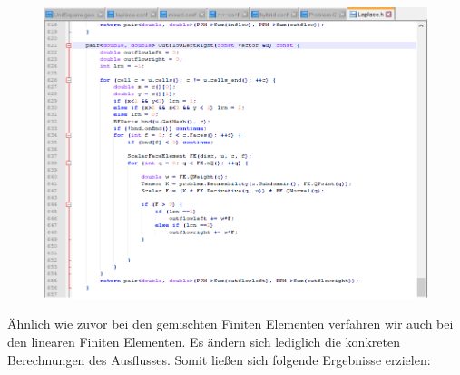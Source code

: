 \begin{figure}[H]
	\centering
	\includegraphics[width=\textwidth]{../../19/laplaceoutflow.png}
	
\end{figure}
Ähnlich wie zuvor bei den gemischten Finiten Elementen verfahren wir auch bei den linearen Finiten Elementen.
Es ändern sich lediglich die konkreten Berechnungen des Ausflusses. \newline
Somit ließen sich folgende Ergebnisse erzielen:
\begin{figure}[H]
	\centering

\end{figure}

